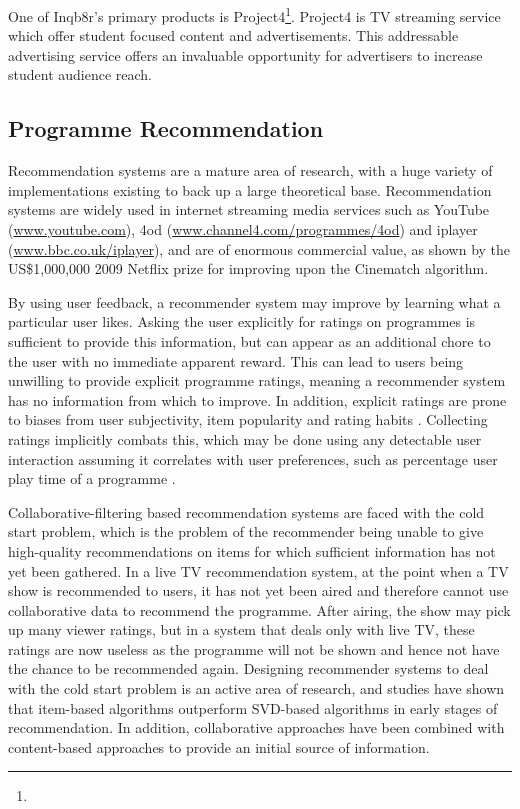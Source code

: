 	One of Inqb8r's primary products is Project4\footnote{}. Project4 is TV streaming service which offer student focused content and advertisements. This addressable advertising service offers an invaluable opportunity for advertisers to increase student audience reach.

	\subsection{Programme Recommendation}

	Recommendation systems are a mature area of research, with a huge variety of implementations existing to back up a large theoretical base. Recommendation systems are widely used in internet streaming media services such as YouTube (\url{www.youtube.com}), 4od (\url{www.channel4.com/programmes/4od}) and iplayer (\url{www.bbc.co.uk/iplayer}), and are of enormous commercial value, as shown by the US\$1,000,000 2009 Netflix prize \citep{pragmatic_chaos} for improving upon the Cinematch algorithm.

	By using user feedback, a recommender system may improve by learning what a particular user likes. Asking the user explicitly for ratings on programmes is sufficient to provide this information, but can appear as an additional chore to the user with no immediate apparent reward. This can lead to users being unwilling to provide explicit programme ratings, meaning a recommender system has no information from which to improve. In addition, explicit ratings are prone to biases from user subjectivity, item popularity and rating habits \citep[p.~304]{recommender-systems-handbook}. Collecting ratings implicitly combats this, which may be done using any detectable user interaction assuming it correlates with user preferences, such as percentage user play time of a programme \citep[p.~305]{recommender-systems-handbook}.

	Collaborative-filtering based recommendation systems are faced with the cold start problem, which is the problem of the recommender being unable to give high-quality recommendations on items for which sufficient information has not yet been gathered. In a live TV recommendation system, at the point when a TV show is recommended to users, it has not yet been aired and therefore cannot use collaborative data to recommend the programme. After airing, the show may pick up many viewer ratings, but in a system that deals only with live TV, these ratings are now useless as the programme will not be shown and hence not have the chance to be recommended again. Designing recommender systems to deal with the cold start problem is an active area of research, and studies have shown that item-based algorithms outperform SVD-based algorithms in early stages of recommendation\cite{cold-start-problem}. In addition, collaborative approaches have been combined with content-based approaches to provide an initial source of information\cite{generative_models}.

